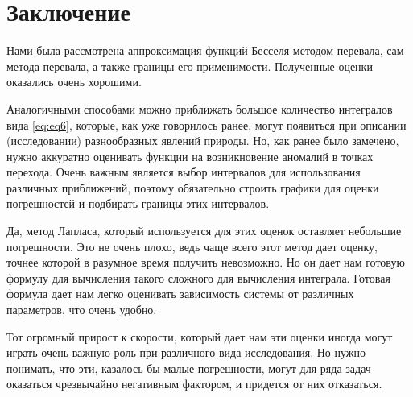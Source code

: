 \documentclass[14pt]{extarticle}
\begin{document}
\section{Заключение}
  
Нами была рассмотрена аппроксимация функций Бесселя методом перевала, сам метода перевала, а также границы его применимости. Полученные оценки оказались очень хорошими. 

Аналогичными способами можно приближать большое количество интегралов вида \ref{eq:eq6}, которые, как уже говорилось ранее, могут появиться при описании (исследовании) разнообразных явлений природы. Но, как ранее было замечено, нужно аккуратно оценивать функции на возникновение аномалий в точках перехода. Очень важным является выбор интервалов для использования различных приближений, поэтому обязательно строить графики для оценки погрешностей и подбирать границы этих интервалов. 

Да, метод Лапласа, который используется для этих оценок оставляет небольшие погрешности. Это не очень плохо, ведь чаще всего этот метод  дает оценку, точнее которой в разумное время получить невозможно. Но он дает нам готовую формулу для вычисления такого сложного для вычисления интеграла. Готовая формула дает нам легко оценивать зависимость системы от различных параметров, что очень удобно. 

Тот огромный прирост к скорости, который дает нам эти оценки иногда могут играть очень важную роль при различного вида исследования. Но нужно понимать, что эти, казалось бы малые погрешности, могут для ряда задач оказаться чрезвычайно негативным фактором, и придется от них отказаться.
 
\newpage
\end{document}
